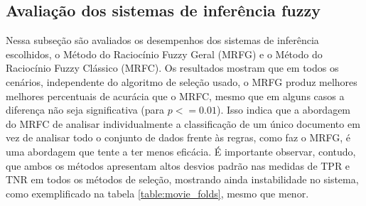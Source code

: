 \documentclass[template.tex]{subfiles}
\begin{document}

%
%
%


\subsection{Avaliação dos sistemas de inferência fuzzy}

Nessa subseção são avaliados os desempenhos dos sistemas de inferência escolhidos, o Método do Raciocínio Fuzzy Geral (MRFG) e o Método do Raciocínio Fuzzy Clássico (MRFC). Os resultados mostram que em todos os cenários, independente do algoritmo de seleção usado, o MRFG produz melhores melhores percentuais de acurácia que o MRFC, mesmo que em alguns casos a diferença não seja significativa (para $p <= 0.01$). Isso indica que a abordagem do MRFC de analisar individualmente a classificação de um único documento em vez de analisar todo o conjunto de dados frente às regras, como faz o MRFG, é uma abordagem que tente a ter menos eficácia. É importante observar, contudo, que ambos os métodos apresentam altos desvios padrão nas medidas de TPR e TNR em todos os métodos de seleção, mostrando ainda instabilidade no sistema, como exemplificado na tabela \ref{table:movie_folds}, mesmo que menor. 
\end{document}
